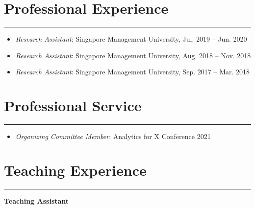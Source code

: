 \documentclass[12pt, a4paper]{article}
\begin{document}
{%

\section*{Professional Experience}
\vspace*{0.4em}
\hrule height 0.5pt
\begin{itemize}[leftmargin=36pt, itemsep=0pt, parsep=0.2pt, topsep=1pt]

	\item {\it Research Assistant}: Singapore Management University, Jul. 2019 -- Jun. 2020

	\item {\it Research Assistant}: Singapore Management University, Aug. 2018 -- Nov. 2018

  \item {\it Research Assistant}: Singapore Management University, Sep. 2017 -- Mar. 2018

\end{itemize}




\section*{Professional Service}
\vspace*{0.4em}
\hrule height 0.5pt
\begin{itemize}[leftmargin=36pt, itemsep=2pt, parsep=0pt, topsep=1pt]

	\item {\it Organizing Committee Member}: Analytics for X Conference 2021

\end{itemize}




\section*{Teaching Experience}
\vspace*{0.4em}
\hrule height 0.5pt
\raggedright\textbf{Teaching Assistant}
\begin{itemize}[leftmargin=36pt, itemsep=2pt, parsep=0pt, topsep=-0.5em]


\end{itemize}}
\end{document}
